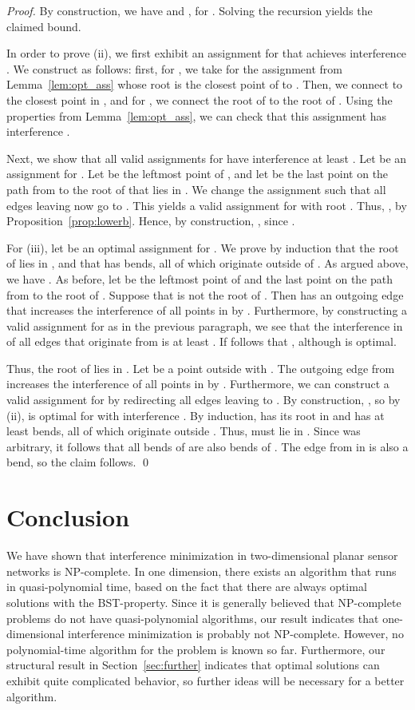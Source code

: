 \documentclass[envcountsect,envcountsame,runningheads,a4paper]{llncs}
\begin{document}
\begin{proof}
By construction, we have  and  ,
for .  Solving the recursion yields the claimed bound.

In order to prove (ii), we first exhibit an assignment
 for  that achieves interference
. We construct  as follows: first, for
, we take for 
the assignment  from
Lemma~\ref{lem:opt_ass} whose root is
the closest point of  to . Then, we
connect  to the closest point in , and
for ,
we connect the root of  to the root of
. Using the properties
from Lemma~\ref{lem:opt_ass}, we can check
that this
assignment has interference .

Next, we show that all valid assignments for
 have interference at least .
Let  be an assignment for .
Let  be the leftmost point of
, and let  be the last point on the
path from  to the root of  that lies
in .
We change the assignment  such that all
edges leaving  now go to
. This yields a valid assignment 
for  with root . Thus, ,
by Proposition~\ref{prop:lowerb}. Hence,
by construction, , since
.

For (iii), let  be an optimal assignment for .
We prove by induction that the root of
 lies in , and that  has  bends,
all of which originate outside of .
As argued above, we have .
As before, let  be the leftmost point of 
and  the last point on the path from  to
the root of . Suppose that  is not
the root of . Then  has an outgoing edge that
increases the interference of all points in 
by . Furthermore, by constructing a valid assignment
 for  as in the previous paragraph,
we see that the interference in  of all edges that originate
from 
is at least . If follows that ,
although  is optimal.

Thus, the root  of  lies in . Let  be a
point outside  with .
The outgoing edge from  increases
the interference of all points in 
by . Furthermore, we can construct a valid assignment
 for  by redirecting all
edges leaving  to . By construction, ,
so by (ii),  is optimal for 
with interference . By induction,  has its root
in  and has at least  bends, all of which originate
outside . Thus,  must lie in .
Since  was arbitrary, it follows that all bends of 
are also bends of . The edge from  in  is
also a bend, so the claim follows.
\qed{}
\end{proof}

\section{Conclusion}

We have shown that interference minimization in two-dimensional planar sensor
networks is NP-complete. In one dimension, there exists an algorithm
that runs in quasi-polynomial time, based on the fact that there are always
optimal solutions with the BST-property. Since it is generally believed that
NP-complete problems do not have quasi-polynomial algorithms, our result indicates
that one-dimensional interference minimization is probably not NP-complete. However,
no polynomial-time algorithm for the problem is known so far. Furthermore,
our structural result in Section~\ref{sec:further} indicates that optimal solutions
can exhibit quite complicated behavior, so further ideas will be necessary for a
better algorithm.
\end{document}
